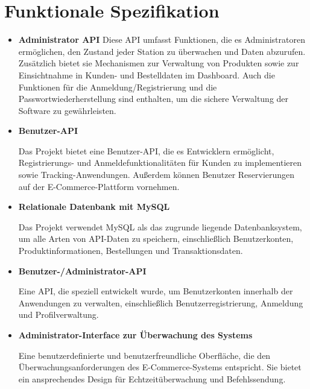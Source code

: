 	\section{Funktionale Spezifikation}
	\begin{itemize}
		\item \textbf{Administrator API}
			Diese API umfasst Funktionen, die es Administratoren ermöglichen, den Zustand jeder Station zu überwachen und Daten abzurufen. Zusätzlich bietet sie Mechanismen zur Verwaltung von Produkten sowie zur Einsichtnahme in Kunden- und Bestelldaten im Dashboard. Auch die Funktionen für die Anmeldung/Registrierung und die Passwortwiederherstellung sind enthalten, um die sichere Verwaltung der Software zu gewährleisten.
		
		\item \textbf{Benutzer-API}
		
		Das Projekt bietet eine Benutzer-API, die es Entwicklern ermöglicht, Registrierungs- und Anmeldefunktionalitäten für Kunden zu implementieren sowie Tracking-Anwendungen. Außerdem können Benutzer Reservierungen auf der E-Commerce-Plattform vornehmen.
		
	\item \textbf{Relationale Datenbank mit MySQL}
	
	Das Projekt verwendet MySQL als das zugrunde liegende Datenbanksystem, um alle Arten von API-Daten zu speichern, einschließlich Benutzerkonten, Produktinformationen, Bestellungen und Transaktionsdaten.
	
	\item \textbf{Benutzer-/Administrator-API}
	
	Eine API, die speziell entwickelt wurde, um Benutzerkonten innerhalb der Anwendungen zu verwalten, einschließlich Benutzerregistrierung, Anmeldung und Profilverwaltung.
	
	\item \textbf{Administrator-Interface zur Überwachung des Systems}

Eine benutzerdefinierte und benutzerfreundliche Oberfläche, die den Überwachungsanforderungen des E-Commerce-Systems entspricht. Sie bietet ein ansprechendes Design für Echtzeitüberwachung und Befehlssendung.
	\end{itemize}
